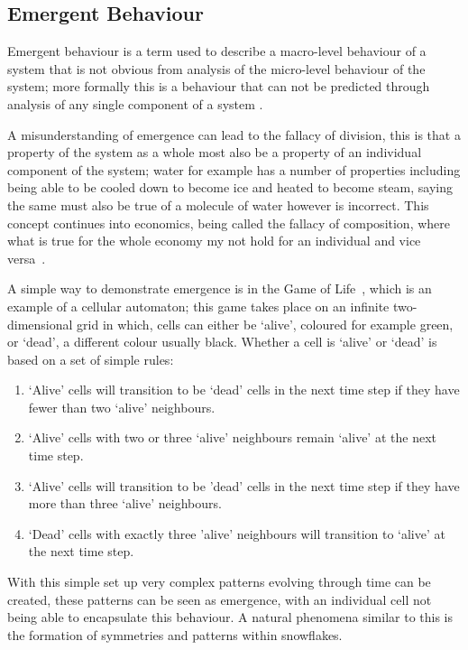 \documentclass{article}
\begin{document}
\subsection{Emergent Behaviour}
Emergent behaviour is a term used to describe a macro-level behaviour of a system that is not obvious from analysis of the micro-level behaviour of the system; more formally this is a behaviour that can not be predicted through analysis of any single component of a system \cite{EB_systemofsystemsGLangford}.

A misunderstanding of emergence can lead to the fallacy of division, this is that a property of the system as a whole most also be a property of an individual component of the system; water for example has a number of properties including being able to be cooled down to become ice and heated to become steam, saying the same must also be true of a molecule of water however is incorrect. This concept continues into economics, being called the fallacy of composition, where what is true for the whole economy my not hold for an individual and vice versa~\cite{fallacyofcompostionBook}.
       
A simple way to demonstrate emergence is in the Game of Life~\cite{gameoflifepage}, which is an example of a cellular automaton; this game takes place on an infinite two-dimensional grid in which, cells can either be `alive', coloured for example green, or `dead', a different colour usually black. Whether a cell is `alive' or `dead' is based on a set of simple rules:   
\begin{enumerate}
  \item `Alive' cells will transition to be `dead' cells in the next time step if they have fewer than two `alive' neighbours.
  \item `Alive' cells with two or three `alive' neighbours remain `alive' at the next time step.
  \item `Alive' cells will transition to be 'dead' cells in the next time step if they have more than three `alive' neighbours.
  \item `Dead' cells with exactly three 'alive' neighbours will transition to `alive' at the next time step.
\end{enumerate}
With this simple set up very complex patterns evolving through time can be created, these patterns can be seen as emergence, with an individual cell not being able to encapsulate this behaviour. A natural phenomena similar to this is the formation of symmetries and patterns within snowflakes.
\end{document}
